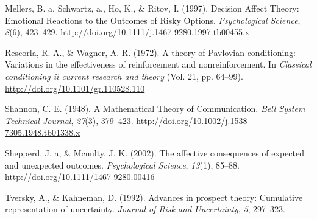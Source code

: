 \documentclass[10pt, letterpaper]{article}
\begin{document}
\hypertarget{ref-Mellers1997}{}
Mellers, B. a, Schwartz, a., Ho, K., \& Ritov, I. (1997). Decision
Affect Theory: Emotional Reactions to the Outcomes of Risky Options.
\emph{Psychological Science}, \emph{8}(6), 423--429.
\url{http://doi.org/10.1111/j.1467-9280.1997.tb00455.x}

\hypertarget{ref-Rescorla1972}{}
Rescorla, R. A., \& Wagner, A. R. (1972). A theory of Pavlovian
conditioning: Variations in the effectiveness of reinforcement and
nonreinforcement. In \emph{Classical conditioning ii current research
and theory} (Vol. 21, pp. 64--99).
\url{http://doi.org/10.1101/gr.110528.110}

\hypertarget{ref-Shannon1948}{}
Shannon, C. E. (1948). A Mathematical Theory of Communication.
\emph{Bell System Technical Journal}, \emph{27}(3), 379--423.
\url{http://doi.org/10.1002/j.1538-7305.1948.tb01338.x}

\hypertarget{ref-Shepperd2002}{}
Shepperd, J. a, \& Mcnulty, J. K. (2002). The affective consequences of
expected and unexpected outcomes. \emph{Psychological Science},
\emph{13}(1), 85--88. \url{http://doi.org/10.1111/1467-9280.00416}

\hypertarget{ref-Tversky1992}{}
Tversky, A., \& Kahneman, D. (1992). Advances in prospect theory:
Cumulative representation of uncertainty. \emph{Journal of Risk and
Uncertainty}, \emph{5}, 297--323.
\end{document}
